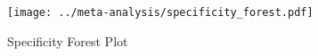 \begin{figure}[p]


\texttt{[image: ../meta-analysis/specificity\_forest.pdf]}

\caption[Specificity Forest Plot]{Specificity Forest Plot}
\label{fig:specificity_forest}
\end{figure}
